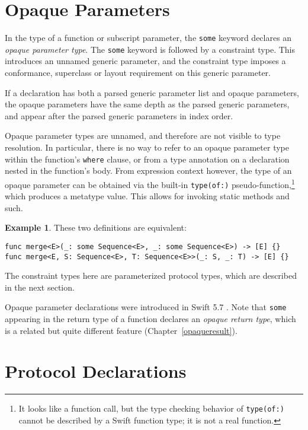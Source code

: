 \documentclass[a4paper,headsepline,bibliography=totoc,toc=flat,fleqn,twoside=semi]{scrbook}
\theoremstyle{definition}
\theoremstyle{definition}
\newtheorem{example}{Example}[chapter]
\theoremstyle{definition}
\begin{document}
\section{Opaque Parameters}\label{opaque parameters}

In the type of a function or subscript parameter, the \texttt{some} keyword declares an \emph{opaque parameter type}. The \texttt{some} keyword is followed by a constraint type. This introduces an unnamed generic parameter, and the constraint type imposes a conformance, superclass or layout requirement on this generic parameter.

If a declaration has both a parsed generic parameter list and opaque parameters, the opaque parameters have the same depth as the parsed generic parameters, and appear after the parsed generic parameters in index order.

Opaque parameter types are unnamed, and therefore are not visible to type resolution. In particular, there is no way to refer to an opaque parameter type within the function's \texttt{where} clause, or from a type annotation on a declaration nested in the function's body. From expression context however, the type of an opaque parameter can be obtained via the built-in \texttt{type(of:)} pseudo-function,\footnote{It looks like a function call, but the type checking behavior of \texttt{type(of:)} cannot be described by a Swift function type; it is not a real function.} which produces a metatype value. This allows for invoking static methods and such.
\begin{example}
These two definitions are equivalent:
\begin{Verbatim}
func merge<E>(_: some Sequence<E>, _: some Sequence<E>) -> [E] {}
func merge<E, S: Sequence<E>, T: Sequence<E>>(_: S, _: T) -> [E] {}
\end{Verbatim}
The constraint types here are parameterized protocol types, which are described in the next section.
\end{example}
Opaque parameter declarations were introduced in Swift 5.7 \cite{se0341}. Note that \texttt{some} appearing in the return type of a function declares an \emph{opaque return type}, which is a related but quite different feature (Chapter~\ref{opaqueresult}).

\section{Protocol Declarations}\label{protocols}
\end{document}
